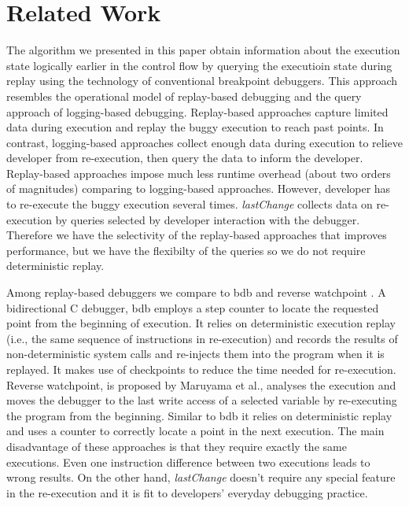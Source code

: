\documentclass{sig-alternate}
\begin{document}
\section{Related Work}
\label{sec:relatedWork}

The algorithm we presented in this paper obtain information about
the execution state logically earlier in the control flow by querying 
the executioin state during replay using the technology of 
conventional breakpoint debuggers.  This
approach resembles the operational model of replay-based debugging 
and the query approach of logging-based
debugging.  Replay-based approaches capture limited data during
execution and replay the buggy execution to reach past points. In
contrast, logging-based approaches collect enough data during
execution to relieve developer from re-execution, then query the data to 
inform the developer. Replay-based
approaches impose much less runtime overhead (about two orders of
magnitudes) comparing to logging-based approaches. However, developer
has to re-execute the buggy execution several
times. \textit{lastChange} collects data on re-execution by queries
selected by developer interaction with the debugger. Therefore we have 
the selectivity of the replay-based approaches that improves performance, 
but we have the flexibilty of the queries so we do not require deterministic replay.

Among replay-based debuggers we compare to bdb \cite{Boothe} and
reverse watchpoint \cite{Maruyama}.  A bidirectional C debugger, bdb
employs a step counter to locate the requested point from the
beginning of execution. It relies on deterministic execution replay
(i.e., the same sequence of instructions in re-execution) and records
the results of non-deterministic system calls and re-injects them into
the program when it is replayed. It makes use of checkpoints to reduce
the time needed for re-execution.  Reverse watchpoint, is proposed by
Maruyama et al., analyses the execution and moves the debugger to the
last write access of a selected variable by re-executing the program
from the beginning\cite{Maruyama}.  Similar to bdb it relies on deterministic
replay and uses a counter to correctly locate a point in the next
execution. The main disadvantage of these approaches is that they require 
exactly the same executions. Even one instruction difference between
two executions leads to wrong results. On the other hand,
\textit{lastChange} doesn't require any special feature in the
re-execution and it is fit to  developers' everyday debugging
practice.
\end{document}
